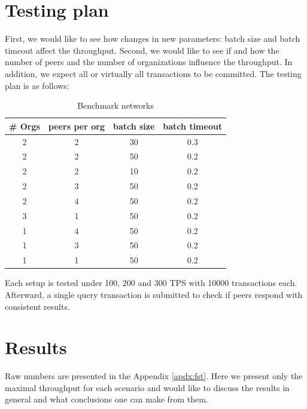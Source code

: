 \section{Testing plan}\label{sec:testplan}

First, we would like to see how changes in new parameters: batch size and batch timeout affect the throughput. Second, we would like to see if and how the number of peers and the number of organizations influence the throughput. In addition, we expect all or virtually all transactions to be committed. The testing plan is as follows:

\begin{table}[h!]
\begin{center}
\begin{tabular}{ c|c|c|c }
  \# Orgs & peers per org & batch size & batch timeout \\
 \hline
 \hline
 2 & 2 & 30 & 0.3 \\
 \hline
 2 & 2 & 50 & 0.2 \\
 \hline
 2 & 2 & 10 & 0.2 \\
 \hline
 2 & 3 & 50 & 0.2 \\
 \hline
 2 & 4 & 50 & 0.2 \\
 \hline
 3 & 1 & 50 & 0.2 \\
 \hline
 1 & 4 & 50 & 0.2 \\
 \hline
 1 & 3 & 50 & 0.2 \\
 \hline
 1 & 1 & 50 & 0.2 \\
 \hline
\end{tabular}
\end{center}
\caption{Benchmark networks}
\label{table:setups}
\end{table}

Each setup is tested under 100, 200 and 300 TPS with 10000 transactions each. Afterward, a single query transaction is submitted to check if peers respond with consistent results.

\section{Results}\label{sec:testres}

Raw numbers are presented in the Appendix \ref{apdx:fst}. Here we present only the maximal throughput for each scenario and would like to discuss the results in general and what conclusions one can make from them.

